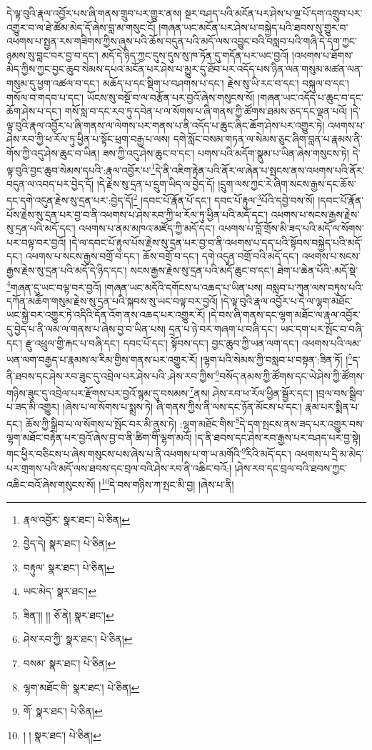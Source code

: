 དེ་ལྟ་བུའི་རྣལ་འབྱོར་པས་ཞི་གནས་གྲུབ་པར་གྱུར་ནས། སྔར་བཤད་པའི་མངོན་པར་ཤེས་པ་ལྔ་པོ་དག་འགྲུབ་པར་འགྱུར་བ་ལ་ཐེ་ཚོམ་མེད་དོ་ཞེས་བླ་མ་གསུང་ངོ། །གཞན་ཡང་མངོན་པར་ཤེས་པ་བསྐྱེད་པའི་ཐབས་སུ་གྱུར་བ་འཕགས་པ་སྤྱན་རས་གཟིགས་ཀྱིས་ཞུས་པའི་ཆོས་བདུན་པའི་མདོ་ལས་འབྱུང་བའི་བསླབ་པའི་གཞི་དེ་དག་ཀྱང་ཉམས་སུ་བླང་བར་བྱ་བ་དང་། མདོ་དེ་ཉིད་ཀྱང་དུས་དུས་སུ་ཁ་ཏོན་དུ་གདོན་པར་ཡང་བྱའོ། །འཕགས་པ་ཐོགས་མེད་ཀྱིས་ཀྱང་བྱང་ཆུབ་སེམས་དཔའ་མངོན་པར་ཤེས་པ་མྱུར་དུ་ཐོབ་པར་འདོད་པས་ཉིན་ལན་གསུམ་མཚན་ལན་གསུམ་དུ་ཕྱག་འཚལ་བ་དང་། མཆོད་པ་དང་སྡིག་པ་བཤགས་པ་དང་། རྗེས་སུ་ཡི་རང་བ་དང་། བསྐུལ་བ་དང་། གསོལ་བ་གདབ་པ་དང་། ཡོངས་སུ་བསྔོ་བ་ལ་བརྩོན་པར་བྱའོ་ཞེས་གསུངས་སོ། །གཞན་ཡང་འདོད་པ་ཆུང་བ་དང་ཆོག་ཤེས་པ་དང་། གསོ་སླ་བ་དང་རབ་ཏུ་དབེན་པ་ལ་སོགས་པ་ཞི་གནས་ཀྱི་ཚོགས་ཐམས་ཅད་དང་ལྡན་པའོ། །དེ་ལྟ་བུའི་རྣལ་འབྱོར་པ་ཞི་གནས་ལ་ལེགས་པར་གནས་པ་ནི་འདོད་པ་ཆུང་ཞིང་ཆོག་ཤེས་པར་འགྱུར་ཏེ། འཕགས་པ་ཤེས་རབ་ཀྱི་ཕ་རོལ་ཏུ་ཕྱིན་པ་སྟོང་ཕྲག་བརྒྱ་པ་ལས། དགེ་སློང་བསམ་གཏན་ལ་སེམས་ཅུང་ཞིག་བླན་པ་རྣམས་ནི་གོས་ཀྱི་འདུ་ཤེས་ཆུང་བ་ཡིན། ཟས་ཀྱི་འདུ་ཤེས་ཆུང་བ་དང་། པགས་པའི་མདོག་སྣུམ་པ་ཡིན་ཞེས་གསུངས་ཏེ། དེ་ལྟ་བུའི་བྱང་ཆུབ་སེམས་དཔའི་:རྣལ་འབྱོར་པ་\footnote{རྣལ་འབྱོར་  སྣར་ཐང་།  པེ་ཅིན། }དེ་ནི་འཇིག་རྟེན་པའི་ནོར་ལ་ཞེན་པ་སྤངས་ནས་འཕགས་པའི་ནོར་བདུན་ལ་འབད་པར་བྱེད་དོ། །དེ་རྗེས་སུ་དྲན་པ་དྲུག་ཡིད་ལ་བྱེད་དོ། །དྲུག་ལས་ཀྱང་རེ་ཞིག་སངས་རྒྱས་དང་ཆོས་དང་དགེ་འདུན་རྗེས་སུ་དྲན་པར་:བྱེད་དོ།\footnote{བྱེད་དེ།  སྣར་ཐང་།  པེ་ཅིན། } །དབང་པོ་རྣོན་པོ་དང་། དབང་པོ་རྟུལ་\footnote{བརྟུལ་  སྣར་ཐང་།  པེ་ཅིན། }པོའི་དབྱེ་བས་སོ། །དབང་པོ་རྣོན་པོས་རྗེས་སུ་དྲན་པར་བྱ་བ་ནི་འཕགས་པ་ཤེས་རབ་ཀྱི་ཕ་རོལ་ཏུ་ཕྱིན་པའི་མདོ་དང་། འཕགས་པ་སངས་རྒྱས་རྗེས་སུ་དྲན་པའི་མདོ་དང་། འཕགས་པ་ནམ་མཁའ་མཛོད་ཀྱི་མདོ་དང་། འཕགས་པ་བློ་གྲོས་མི་ཟད་པའི་མདོ་ལ་སོགས་པར་བལྟ་བར་བྱའོ། །དེ་ལ་དབང་པོ་རྟུལ་པོས་རྗེས་སུ་དྲན་པར་བྱ་བ་ནི་འཕགས་པ་དད་པའི་སྟོབས་བསྐྱེད་པའི་མདོ་དང་། འཕགས་པ་སངས་རྒྱས་བགྲོ་བ་དང་། ཆོས་བགྲོ་བ་དང་། དགེ་འདུན་བགྲོ་བའི་མདོ་དང་། འཕགས་པ་སངས་རྒྱས་རྗེས་སུ་དྲན་པའི་མདོ་དེ་ཉིད་དང་། སངས་རྒྱས་རྗེས་སུ་དྲན་པའི་མདོ་ཆུང་བ་དང་། ཐེག་པ་ཆེན་པོའི་:མདོ་སྡེ་\footnote{ཡང་མེད་  སྣར་ཐང་། }གཞན་དུ་ཡང་བལྟ་བར་བྱའོ། །གཞན་ཡང་མདོའི་དགོངས་པ་འཆད་པ་ཡིན་པས། བསླབ་པ་ཀུན་ལས་བཏུས་པའི་དཀོན་མཆོག་གསུམ་རྗེས་སུ་དྲན་པའི་སྐབས་སུ་ཡང་བལྟ་བར་བྱའོ། །དེ་ལྟ་བུའི་རྣལ་འབྱོར་པ་དེ་ལ་ལྷག་མཐོང་ཡང་སྐྱེ་བར་འགྱུར་ཏེ་འདིའི་དོན་འོག་ནས་འཆད་པར་འགྱུར་རོ། །དེ་བས་ཞི་གནས་དང་ལྷག་མཐོང་ལ་རྣལ་འབྱོར་དུ་བྱེད་པ་ནི་ལམ་ལ་གནས་པ་ཞེས་བྱ་བ་ཡིན་པས། དྲན་པ་ཉེ་བར་གཞག་པ་བཞི་དང་། ཡང་དག་པར་སྤོང་བ་བཞི་དང་། རྫུ་འཕྲུལ་གྱི་རྐང་པ་བཞི་དང་། དབང་པོ་དང་། སྟོབས་དང་། བྱང་ཆུབ་ཀྱི་ཡན་ལག་དང་། འཕགས་པའི་ལམ་ཡན་ལག་བརྒྱད་པ་རྣམས་ལ་རིམ་གྱིས་གནས་པར་འགྱུར་རོ། །ལྷག་པའི་སེམས་ཀྱི་བསླབ་པ་བསྟན་:ཟིན་ཏོ། །\footnote{ཟིན་།། །།  ཅོ་ནེ།  སྣར་ཐང་། }ད་ནི་ཐབས་དང་ཤེས་རབ་ཟུང་དུ་འབྲེལ་པར་ཤེས་པའི་:ཤེས་རབ་ཀྱིས་\footnote{ཤེས་རབ་ཀྱི་  སྣར་ཐང་།  པེ་ཅིན། }བསོད་ནམས་ཀྱི་ཚོགས་དང་ཡེ་ཤེས་ཀྱི་ཚོགས་གཉིས་ཟུང་དུ་འབྲེལ་པར་རྫོགས་པར་བྱའོ་སྙམ་དུ་བསམས་\footnote{བསམ་  སྣར་ཐང་།  པེ་ཅིན། }ནས། ཤེས་རབ་ཕ་རོལ་ཕྱིན་སྦྱོར་དང་། །བྲལ་བས་སྒྲིབ་པ་ཟད་མི་འགྱུར། །ཞེས་པ་ལ་སོགས་པ་སྨྲས་ཏེ། ཞི་གནས་ཀྱིས་ནི་ལས་དང་ཉོན་མོངས་པ་དང་། རྣམ་པར་སྨིན་པ་དང་། ཆོས་ཀྱི་སྒྲིབ་པ་ལ་སོགས་པ་སྤོང་བར་མི་ནུས་ཏེ། :ལྷག་མཐོང་གིས་\footnote{ལྷག་མཐོང་གི་  སྣར་ཐང་།  པེ་ཅིན། }དེ་དག་སྤངས་ནས་ཟད་པར་འགྱུར་བས་ལྷག་མཐོང་བརྟེན་པར་བྱའོ་ཞེས་བྱ་བ་ནི་ཚིག་གི་ལྷག་མའོ། །ད་ནི་ཐབས་དང་ཤེས་རབ་རྒྱས་པར་བཤད་པར་བྱ་སྟེ། གང་ཕྱིར་བཅིངས་པ་ཞེས་གསུངས་པས་ཞེས་པ་ནི་འཕགས་པ་ག་ཡ་མགོའི་\footnote{གོ་  སྣར་ཐང་།  པེ་ཅིན། }རིའི་མདོ་དང་། འཕགས་པ་དྲི་མ་མེད་པར་གྲགས་པའི་མདོ་ལས་ཐབས་དང་བྲལ་བའི་ཤེས་རབ་ནི་འཆིང་བའོ:། །ཤེས་རབ་དང་བྲལ་བའི་ཐབས་ཀྱང་འཆིང་བའོ་ཞེས་གསུངས་སོ། །\footnote{། །  སྣར་ཐང་།  པེ་ཅིན། }དེ་བས་གཉིས་ཀ་སྤང་མི་བྱ། །ཞེས་པ་ནི། 